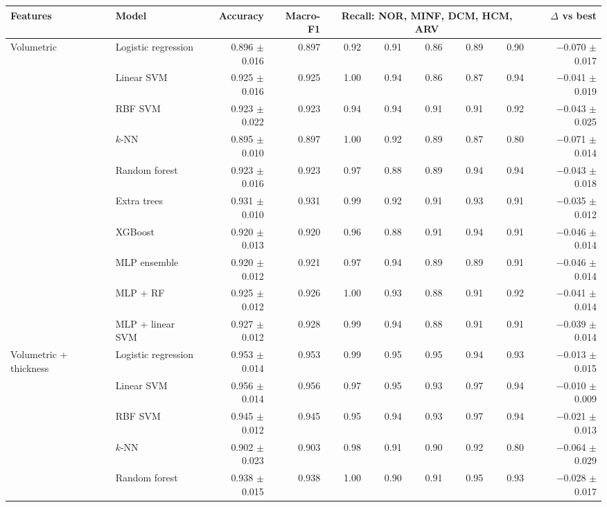 \begin{table}[H]
\centering
\scriptsize
\setlength{\tabcolsep}{4pt}
\begin{adjustbox}{max width=\linewidth}
\begin{tabular}{llrrrrrrrr}
\toprule
Features & Model & Accuracy & Macro-F1 & \multicolumn{5}{c}{Recall: NOR, MINF, DCM, HCM, ARV} & $\Delta$ vs best \\
\midrule
Volumetric & Logistic regression & 0.896 $\pm$ 0.016 & 0.897 & 0.92 & 0.91 & 0.86 & 0.89 & 0.90 & $-$0.070 $\pm$ 0.017 \\
 & Linear SVM & 0.925 $\pm$ 0.016 & 0.925 & 1.00 & 0.94 & 0.86 & 0.87 & 0.94 & $-$0.041 $\pm$ 0.019 \\
 & RBF SVM & 0.923 $\pm$ 0.022 & 0.923 & 0.94 & 0.94 & 0.91 & 0.91 & 0.92 & $-$0.043 $\pm$ 0.025 \\
 & $k$-NN & 0.895 $\pm$ 0.010 & 0.897 & 1.00 & 0.92 & 0.89 & 0.87 & 0.80 & $-$0.071 $\pm$ 0.014 \\
 & Random forest & 0.923 $\pm$ 0.016 & 0.923 & 0.97 & 0.88 & 0.89 & 0.94 & 0.94 & $-$0.043 $\pm$ 0.018 \\
 & Extra trees & 0.931 $\pm$ 0.010 & 0.931 & 0.99 & 0.92 & 0.91 & 0.93 & 0.91 & $-$0.035 $\pm$ 0.012 \\
 & XGBoost & 0.920 $\pm$ 0.013 & 0.920 & 0.96 & 0.88 & 0.91 & 0.94 & 0.91 & $-$0.046 $\pm$ 0.014 \\
 & MLP ensemble & 0.920 $\pm$ 0.012 & 0.921 & 0.97 & 0.94 & 0.89 & 0.89 & 0.91 & $-$0.046 $\pm$ 0.014 \\
 & MLP + RF & 0.925 $\pm$ 0.012 & 0.926 & 1.00 & 0.93 & 0.88 & 0.91 & 0.92 & $-$0.041 $\pm$ 0.014 \\
 & MLP + linear SVM & 0.927 $\pm$ 0.012 & 0.928 & 0.99 & 0.94 & 0.88 & 0.91 & 0.91 & $-$0.039 $\pm$ 0.014 \\
\midrule
Volumetric + thickness & Logistic regression & 0.953 $\pm$ 0.014 & 0.953 & 0.99 & 0.95 & 0.95 & 0.94 & 0.93 & $-$0.013 $\pm$ 0.015 \\
 & Linear SVM & 0.956 $\pm$ 0.014 & 0.956 & 0.97 & 0.95 & 0.93 & 0.97 & 0.94 & $-$0.010 $\pm$ 0.009 \\
 & RBF SVM & 0.945 $\pm$ 0.012 & 0.945 & 0.95 & 0.94 & 0.93 & 0.97 & 0.94 & $-$0.021 $\pm$ 0.013 \\
 & $k$-NN & 0.902 $\pm$ 0.023 & 0.903 & 0.98 & 0.91 & 0.90 & 0.92 & 0.80 & $-$0.064 $\pm$ 0.029 \\
 & Random forest & 0.938 $\pm$ 0.015 & 0.938 & 1.00 & 0.90 & 0.91 & 0.95 & 0.93 & $-$0.028 $\pm$ 0.017 \\

\end{tabular}
\end{adjustbox}
\end{table}
